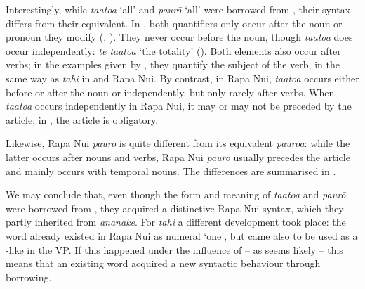 Interestingly, while \textit{ta{\ꞌ}ato{\ꞌ}a} ‘all’ and \textit{paurō} ‘all’ were borrowed from , their syntax differs from their  equivalent. In , both quantifiers only occur after the noun or pronoun they modify (\citealt[172]{LazardPeltzer2000}, \citealt[148–149]{AcadémieTahitienne1986}). They never occur before the noun, though \textit{ta{\ꞌ}ato{\ꞌ}a} does occur independently: \textit{te ta{\ꞌ}ato{\ꞌ}a} ‘the totality’ (\citealt[149]{AcadémieTahitienne1986}). Both elements also occur after verbs; in the examples given by \citet[147]{LazardPeltzer2000}, they quantify the subject of the verb, in the same way as \textit{tahi} in  and Rapa Nui. By contrast, in Rapa Nui, \textit{ta{\ꞌ}ato{\ꞌ}a} occurs either before or after the noun or independently, but only rarely after verbs. When \textit{\mbox{ta{\ꞌ}ato{\ꞌ}a}} occurs independently in Rapa Nui, it may or may not be preceded by the article; in , the article is obligatory.

Likewise, Rapa Nui \textit{paurō} is quite different from its  equivalent \textit{pauroa}: while the latter occurs after nouns and verbs, Rapa Nui \textit{paurō} usually precedes the article and mainly occurs with temporal nouns. The differences are summarised in .

\begin{table}
\end{table}

We may conclude that, even though the form and meaning of \textit{ta{\ꞌ}ato{\ꞌ}a} and \textit{paurō} were borrowed from , they acquired a distinctive Rapa Nui syntax, which they partly inherited from \textit{ananake}. For \textit{tahi} a different development took place: the word already existed in Rapa Nui as numeral ‘one’, but came also to be used as a -like  in the VP. If this happened under the influence of  – as seems likely – this means that an existing word acquired a new syntactic behaviour through borrowing. 

